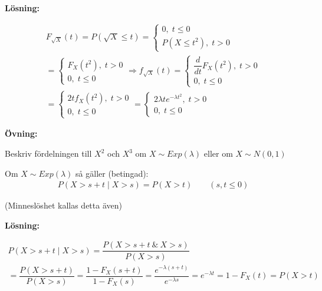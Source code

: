 \par\bigskip
\noindent\textbf{Lösning:}\par
\begin{equation*}
  \begin{gathered}
    F_{\sqrt{X}}(t) = P(\sqrt{X}\leq t) = \begin{cases}0,\;t\leq0\\P(X\leq t^2),\; t>0\end{cases}\\
    = \begin{cases}F_X(t^2),\;t>0\\0,\;t\leq0\end{cases}\Rightarrow f_{\sqrt{X}}(t) = \begin{cases}\dfrac{d}{dt}F_X(t^2),\;t>0\\0,\;t\leq0\end{cases}\\
    = \begin{cases}2tf_X(t^2),\;t>0\\0,\;t\leq0\end{cases} = \begin{cases}2\lambda te^{-\lambda t^2},\;t>0\\0,\;t\leq0\end{cases}
  \end{gathered}
\end{equation*}
\par\bigskip
\noindent\textbf{Övning:}\par
\noindent Beskriv fördelningen till $X^2$ och $X^3$ om $X\sim Exp(\lambda)$ eller om $X\sim N(0,1)$
\par\bigskip
\noindent Om $X\sim Exp(\lambda)$ så gäller (betingad):
\begin{equation*}
  \begin{gathered}
    P(X>s+t\;|\;X>s) = P(X>t)\qquad (s,t\leq0)
  \end{gathered}
\end{equation*}
\par\bigskip
\noindent (Minneslöshet kallas detta även)
\par\bigskip
\noindent\textbf{Lösning:}\par
\begin{equation*}
  \begin{gathered}
    P(X>s+t\;|\;X>s) = \dfrac{P(X>s+t\:\&\: X>s)}{P(X>s)}\\
    = \dfrac{P(X>s+t)}{P(X>s)} = \dfrac{1-F_X(s+t)}{1-F_X(s)} = \dfrac{e^{-\lambda(s+t)}}{e^{-\lambda s}} = e^{-\lambda t} = 1-F_X(t) = P(X>t)
  \end{gathered}
\end{equation*}
